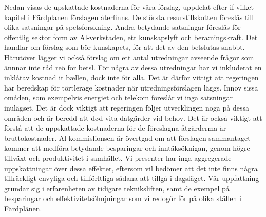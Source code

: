 {{{Nedan visas de upskattade kostnaderna för våra förslag, uppdelat efter if vilket kapitel i Färdplanen förslagen återfinns. De största resurstillskotten föreslås till olika satsningar på spetsforskning. Andra betydande satsningar föreslås för offentlig sektor form av Al-verkstaden, ett kunskapslyft och bera:ningskraft. Det handlar om förslag som bör kunskapets, för att det av den betslutas snabbt. Härutöver lägger vi också förslag om ett antal utredningar avseende frågor som ännnar inte råd reö for betsl. För några av dessa utredningar har vi inkluderat en inklåtav kostnad it bællen, dock inte för alla. Det är därför vittigt att regeringen har beredskap för törtlerage kostnader när utredningsförslagen läggs. Innov sissa omåden, som exempelvis energiet och telekom föreslår vi inga satsningar inulägset. Det är dock viktigt att regeringen följer utvecklingen noga på dessa områden och är beredd att død vita dåtgärder vid behov.
Det är också viktigt att förstå att de uppskattade kostnaderna för de föreslagna åtgärderma är bruttokostnader. Al-kommislionsen är övertgad om att förslagen sammantaget kommer att medföra betydande besparingar och inntäksöknigan, genom högre tillväxt och produktivitet i samhället. Vi presenter har inga aggregerade uppskattningar över dessa effekter, eftersom vil bedömer att det inte finns några tillräckligt envyliga och tillförltliga sådana att tillgå i dagsläget. Vår uppfattning grundar sig i erfarenheten av tidigare tekniksliften, samt de exempel på besparingar och effektivitetsöhnjningar som vi redogör för på olika ställen i Färdplänen.
}}}

